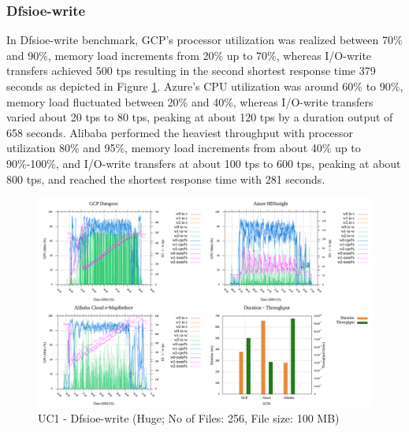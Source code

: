 \documentclass[review]{elsarticle}
\begin{document}
	\subsubsection{Dfsioe-write}
	In Dfsioe-write benchmark, GCP's processor utilization was realized between 70\% and 90\%, memory load increments from 20\% up to 70\%, whereas I/O-write transfers achieved 500 tps resulting in the second shortest response time 379 seconds as depicted in Figure \ref{fig:uc1-dfsioew-h-cmidt}. Azure's CPU utilization was around 60\% to 90\%, memory load fluctuated between 20\% and 40\%, whereas I/O-write transfers varied about 20 tps to 80 tps, peaking at about 120 tps by a duration output of 658 seconds. Alibaba performed the heaviest throughput with processor utilization 80\% and 95\%, memory load increments from about 40\% up to 90\%-100\%, and I/O-write transfers at about 100 tps to 600 tps, peaking at about 800 tps, and reached the shortest response time with 281 seconds.
	
	\begin{figure}[p]
		\caption{UC1 - Dfsioe-write (Huge; No of Files: 256, File size: 100 MB)}
		\label{fig:uc1-dfsioew-h-cmidt}
		\includegraphics[width=\textwidth]{uc1-dfsioew-h-cmidt}
		\centering
	\end{figure}
	
\end{document}
